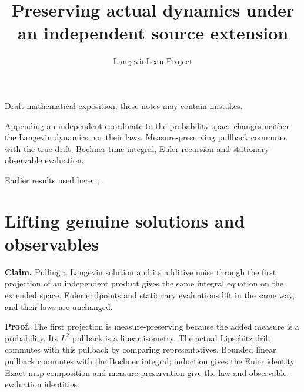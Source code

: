 \documentclass[11pt,a4paper]{article}
\title{\texorpdfstring{Preserving actual dynamics under an independent source extension}{Preserving actual dynamics under an independent source extension}}
\author{LangevinLean Project}
\date{}
\begin{document}
\maketitle
Draft mathematical exposition; these notes may contain mistakes.


Appending an independent coordinate to the probability space changes neither the Langevin dynamics nor their laws. Measure-preserving pullback commutes with the true drift, Bochner time integral, Euler recursion and stationary observable evaluation.



Earlier results used here: \cite[Section~3.14]{LangevinLean2026Kinetic}; \cite[Section~3.16]{LangevinLean2026ULASC}.

\section{\texorpdfstring{Lifting genuine solutions and observables}{Lifting genuine solutions and observables}}


\textbf{Claim.} Pulling a Langevin solution and its additive noise through the first projection of an independent product gives the same integral equation on the extended space. Euler endpoints and stationary evaluations lift in the same way, and their laws are unchanged.



\textbf{Proof.} The first projection is measure-preserving because the added measure is a probability. Its \(L^2\) pullback is a linear isometry. The actual Lipschitz drift commutes with this pullback by comparing representatives. Bounded linear pullback commutes with the Bochner integral; induction gives the Euler identity. Exact map composition and measure preservation give the law and observable-evaluation identities.
\end{document}

